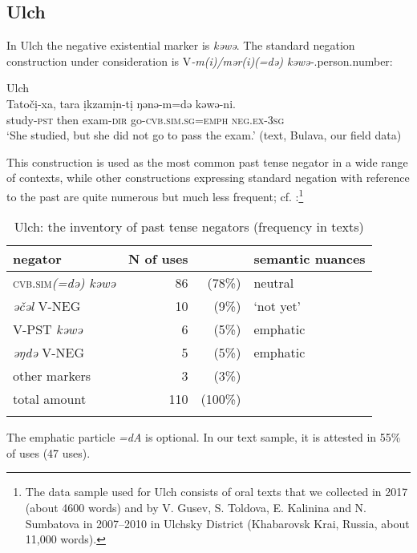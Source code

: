 \documentclass[output=paper,colorlinks,citecolor=brown]{langscibook}
\begin{document}
\subsection{Ulch}\label{sec:T5.4}

In Ulch the negative existential marker is \textit{kəwə}. The standard negation construction under consideration is V\textit{-m(i)/mər(i)(=də) kəwə-}.person.number:

\ea Ulch \label{ex:T16}\\
	\gll Tatočị-xa,	tara	ịkzamịn-tị	ŋənə-m=də	kəwə-ni.\\
	study-\textsc{pst}	then	exam-\textsc{dir}	go-\textsc{cvb.sim.sg=emph}	\textsc{neg.ex-3sg}\\
	\glt `She studied, but she did not go to pass the exam.' (text, Bulava, our field data)
\z

This construction is used as the most common past tense negator in a wide range of contexts, while other constructions expressing standard negation with reference to the past are quite numerous but much less frequent; cf. :\footnote{The data sample used for Ulch consists of oral texts that we collected in 2017 (about 4600 words) and by V. Gusev, S. Toldova, E. Kalinina and N. Sumbatova in 2007–2010 in Ulchsky District (Khabarovsk Krai, Russia, about 11,000 words).}

\begin{table}
    \caption{Ulch: the inventory of past tense negators (frequency in texts)}
    \label{tab:T5}
    \begin{tabularx}{.8\textwidth}{Xrrl}
    \lsptoprule
    negator & N of uses&  & semantic nuances \\ \midrule
    \rowcolor[HTML]{EFEFEF} 
    \textsc{cvb.sim}\textit{(=də) kəwə} & 86& (78\%) & neutral \\
    \textit{əčəl }V-NEG & 10&(9\%) & ‘not yet’ \\
    V-PST \textit{kəwə} & 6 &(5\%) & emphatic \\
    \textit{əŋdə} V-NEG & 5 &(5\%) & emphatic \\
    other markers & 3       &(3\%) &  \\ \midrule
    total amount & 110      &(100\%) &  \\ \lspbottomrule
    \end{tabularx}
\end{table}


The emphatic particle \textit{=dA} is optional. In our text sample, it is attested in 55\% of uses (47 uses).
\end{document}
